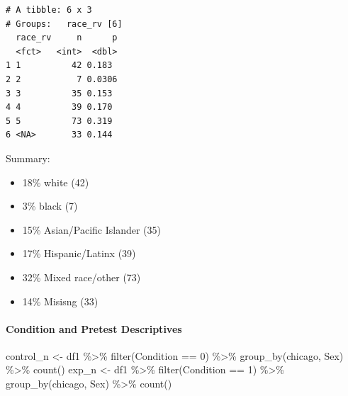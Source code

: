 \documentclass[
  letterpaper,
  DIV=11,
  numbers=noendperiod]{scrartcl}
\let\oldparagraph\paragraph
\renewcommand{\paragraph}[1]{\oldparagraph{#1}\mbox{}}
\newenvironment{Shaded}{\begin{snugshade}}{\end{snugshade}}
\newcommand{\DecValTok}[1]{\textcolor[rgb]{0.25,0.63,0.44}{#1}}
\newcommand{\FunctionTok}[1]{\textcolor[rgb]{0.02,0.16,0.49}{#1}}
\newcommand{\NormalTok}[1]{\textcolor[rgb]{0.00,0.44,0.13}{#1}}
\newcommand{\OtherTok}[1]{\textcolor[rgb]{0.00,0.44,0.13}{#1}}
\newcommand{\SpecialCharTok}[1]{\textcolor[rgb]{0.25,0.44,0.63}{#1}}
\providecommand{\tightlist}{%
  \setlength{\itemsep}{0pt}\setlength{\parskip}{0pt}}\usepackage{longtable,booktabs,array}
\begin{document}
\begin{verbatim}
# A tibble: 6 x 3
# Groups:   race_rv [6]
  race_rv     n      p
  <fct>   <int>  <dbl>
1 1          42 0.183 
2 2           7 0.0306
3 3          35 0.153 
4 4          39 0.170 
5 5          73 0.319 
6 <NA>       33 0.144 
\end{verbatim}

Summary:

\begin{itemize}
\tightlist
\item
  18\% white (42)
\item
  3\% black (7)
\item
  15\% Asian/Pacific Islander (35)
\item
  17\% Hispanic/Latinx (39)
\item
  32\% Mixed race/other (73)
\item
  14\% Misisng (33)
\end{itemize}

\hypertarget{condition-and-pretest-descriptives}{%
\paragraph{Condition and Pretest
Descriptives}\label{condition-and-pretest-descriptives}}

\begin{Shaded}
\begin{Highlighting}[]
\NormalTok{control\_n }\OtherTok{\textless{}{-}}\NormalTok{ df1 }\SpecialCharTok{\%\textgreater{}\%} 
  \FunctionTok{filter}\NormalTok{(Condition }\SpecialCharTok{==} \DecValTok{0}\NormalTok{) }\SpecialCharTok{\%\textgreater{}\%} \FunctionTok{group\_by}\NormalTok{(chicago, Sex) }\SpecialCharTok{\%\textgreater{}\%} \FunctionTok{count}\NormalTok{()}
\NormalTok{exp\_n }\OtherTok{\textless{}{-}}\NormalTok{ df1 }\SpecialCharTok{\%\textgreater{}\%} 
  \FunctionTok{filter}\NormalTok{(Condition }\SpecialCharTok{==} \DecValTok{1}\NormalTok{) }\SpecialCharTok{\%\textgreater{}\%} \FunctionTok{group\_by}\NormalTok{(chicago, Sex) }\SpecialCharTok{\%\textgreater{}\%} \FunctionTok{count}\NormalTok{()}
\end{Highlighting}
\end{Shaded}
\end{document}
